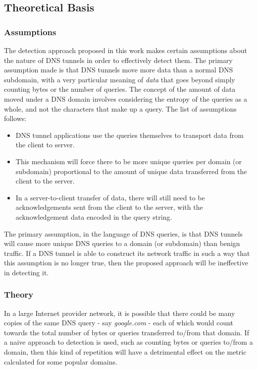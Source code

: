 \documentclass{llncs}
\begin{document}
\subsection{Theoretical Basis}
\subsubsection{Assumptions}
The detection approach proposed in this work
makes certain assumptions about the nature of DNS tunnels in order to
effectively detect them. The primary assumption made is that DNS tunnels move
more data than a normal DNS subdomain, with a very particular meaning of
\emph{data} that goes beyond simply counting bytes or the number of queries. The
concept of the amount of data moved under a DNS domain involves considering the
entropy of the queries as a whole, and not the characters that make up a query.
The list of assumptions follows:

\begin{itemize}
\item DNS tunnel applications use the queries themselves to transport data from
the client to server.
\item This mechanism will force there to be more unique
queries per domain (or subdomain) proportional to the amount of unique data transferred
from the client to the server.
\item In a server-to-client transfer of data, there will still need to be
acknowledgements sent from the client to the server, with the acknowledgement
data encoded in the query string.
\end{itemize}

The primary assumption, in the language of DNS queries, is that DNS tunnels will
cause more unique DNS queries to a domain (or subdomain) than benign traffic. If
a DNS tunnel is able to construct its network traffic in such a way that this
assumption is no longer true, then the proposed approach will be ineffective in
detecting it.

\subsubsection{Theory}
In a large Internet provider network, it is possible that there could be many
copies of the same DNS query - say \emph{google.com} - each of which would count
towards the total number of bytes or queries transferred to/from that domain. If a naive
approach to detection is used, such as counting bytes or queries to/from a
domain, then this kind of repetition will have a detrimental effect on the
metric calculated for some popular domains.
\end{document}
